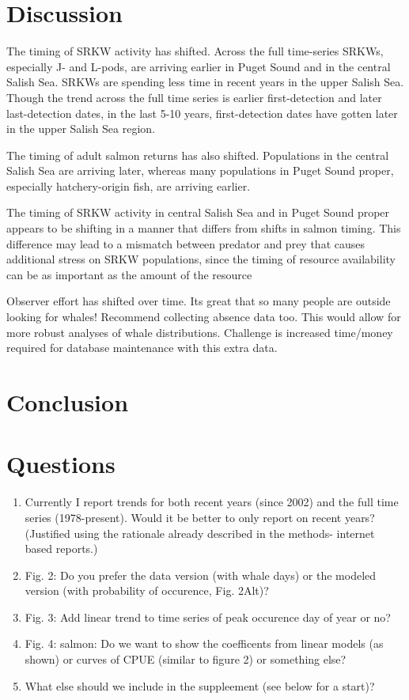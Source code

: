 \documentclass{article}
\begin{document}
\section*{Discussion}
\par The timing of SRKW activity has shifted. Across the full time-series SRKWs, especially J- and L-pods, are arriving earlier in Puget Sound and in the central Salish Sea. SRKWs are spending less time in recent years in the upper Salish Sea. Though the trend across the full time series is earlier first-detection and later last-detection dates, in the last 5-10 years, first-detection dates have gotten later in the upper Salish Sea region.
\par The timing of adult salmon returns has also shifted. Populations in the central Salish Sea are arriving later, whereas many populations in Puget Sound proper, especially hatchery-origin fish, are arriving earlier. 
\par The timing of SRKW activity in central Salish Sea and in Puget Sound proper appears to be shifting in a manner that differs from shifts in salmon timing. This difference may lead to a mismatch between predator and prey that causes additional stress on SRKW populations, since the timing of resource availability can be as important as the amount of the resource \citep[Brianna's work,][]{hipfner2008}
\par Observer effort has shifted over time. Its great that so many people are outside looking for whales! Recommend collecting absence data too. This would allow for more robust analyses of whale distributions. Challenge is increased time/money required for database maintenance with this extra data.

\section*{Conclusion}

\section*{Questions}

\begin{enumerate}
\item Currently I report trends for both recent years (since 2002) and the full time series (1978-present). Would it be better to only report on recent years? (Justified using the rationale already described in the methods- internet based reports.)
\item Fig. 2: Do you prefer the data version (with whale days) or the modeled version (with probability of occurence, Fig. 2Alt)?
\item Fig. 3: Add linear trend to time series of peak occurence day of year or no?
\item Fig. 4: salmon: Do we want to show the coefficents from linear models (as shown) or curves of CPUE (similar to figure 2) or something else?
\item What else should we include in the suppleement (see below for a start)?

\end{enumerate}
\end{document}
